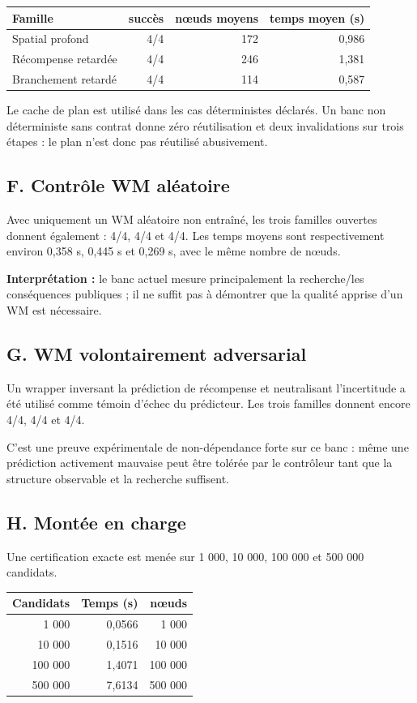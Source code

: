 \documentclass[11pt,a4paper]{article}
\begin{document}
\begin{longtable}{p{}rrr}
\toprule
Famille & succès & nœuds moyens & temps moyen (s) \\
\midrule
Spatial profond & 4/4 & 172 & 0,986 \\
Récompense retardée & 4/4 & 246 & 1,381 \\
Branchement retardé & 4/4 & 114 & 0,587 \\
\bottomrule
\end{longtable}

Le cache de plan est utilisé dans les cas déterministes déclarés. Un banc non déterministe sans contrat donne zéro réutilisation et deux invalidations sur trois étapes : le plan n'est donc pas réutilisé abusivement.
\subsection{F. Contrôle WM aléatoire}
Avec uniquement un WM aléatoire non entraîné, les trois familles ouvertes donnent également : 4/4, 4/4 et 4/4. Les temps moyens sont respectivement environ 0,358 s, 0,445 s et 0,269 s, avec le même nombre de nœuds.

\textbf{Interprétation :} le banc actuel mesure principalement la recherche/les conséquences publiques ; il ne suffit pas à démontrer que la qualité apprise d'un WM est nécessaire.
\subsection{G. WM volontairement adversarial}
Un wrapper inversant la prédiction de récompense et neutralisant l'incertitude a été utilisé comme témoin d'échec du prédicteur. Les trois familles donnent encore 4/4, 4/4 et 4/4.

C'est une preuve expérimentale de non-dépendance forte sur ce banc : même une prédiction activement mauvaise peut être tolérée par le contrôleur tant que la structure observable et la recherche suffisent.
\subsection{H. Montée en charge}
Une certification exacte est menée sur 1 000, 10 000, 100 000 et 500 000 candidats.
\begin{longtable}{rrr}
\toprule
Candidats & Temps (s) & nœuds \\
\midrule
1 000 & 0,0566 & 1 000 \\
10 000 & 0,1516 & 10 000 \\
100 000 & 1,4071 & 100 000 \\
500 000 & 7,6134 & 500 000 \\
\bottomrule
\end{longtable}
\end{document}

